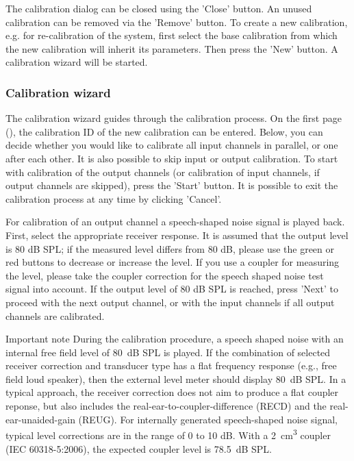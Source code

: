 \documentclass[11pt,a4paper,twoside]{article}
\makeatletter
\newcommand{\+}{\discretionary{\mbox{\scriptsize$\hookleftarrow$}}{}{}}
\renewcommand{\paragraph}{%
  \@startsection{paragraph}{4}{0ex}{-1.0ex}{1.0ex}{%
    \normalfont\normalsize\bfseries\SS@parafont%
  }%
}
\makeatother
\begin{document}
The calibration dialog can be closed using the 'Close' button.
%
An unused calibration can be removed via the 'Remove' button.
%
To create a new calibration, e.g. for re-calibration of the system,
first select the base calibration from which the new calibration will
inherit its parameters.
%
Then press the 'New' button.
%
A calibration wizard will be started.


\subsubsection*{Calibration wizard}

The calibration wizard guides through the calibration process.
%
On the first page (), the
calibration ID of the new calibration can be entered.
%
Below, you can decide whether you would like to calibrate all input
channels in parallel, or one after each other.
%
It is also possible to skip input or output calibration.
%
To start with calibration of the output channels (or calibration of
input channels, if output channels are skipped), press the 'Start'
button.
%
It is possible to exit the calibration process at any time by clicking
'Cancel'.


For calibration of an output channel a speech-shaped noise signal is
played back.
%
First, select the appropriate receiver response.
%
It is assumed that the output level is 80 dB SPL; if the measured
level differs from 80 dB, please use the green or red buttons to
decrease or increase the level.
%
If you use a coupler for measuring the level, please take the coupler
correction for the speech shaped noise test signal into account.
%
If the output level of 80 dB SPL is reached, press 'Next' to proceed
with the next output channel, or with the input channels if all output
channels are calibrated.

\paragraph{Important note}
%
During the calibration procedure, a speech shaped noise with an
internal free field level of 80~dB SPL is played.
%
If the combination of selected receiver correction and transducer type has a flat frequency response (e.g., free field loud speaker), then the external level meter should display 80~dB SPL.
%
In a typical approach, the receiver correction does not aim to produce
a flat coupler reponse, but also includes the
real-ear-to-coupler-difference (RECD) and the real-ear-unaided-gain
(REUG).
%
For internally generated speech-shaped noise signal, typical level
corrections are in the range of 0 to 10 dB.
%
With a 2~cm\textsuperscript{3} coupler (IEC 60318-5:2006), the expected
coupler level is 78.5~dB SPL.
%
%
\end{document}
